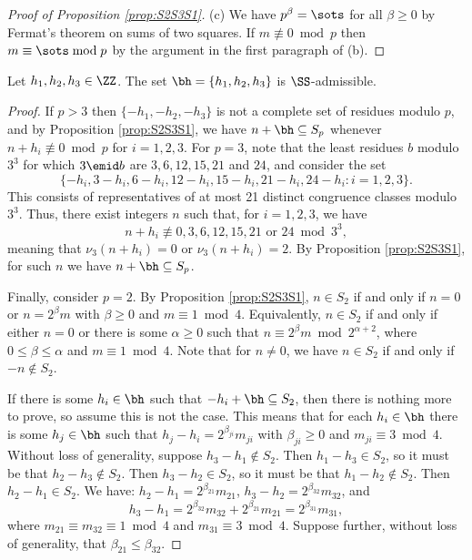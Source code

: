 \documentclass[12pt, reqno, twoside, letterpaper]{amsart}
\begin{document}
\begin{nix}
\begin{proof}[Proof of Proposition \ref{prop:S2S3S1}]
(c) 
%
We have $p^{\beta} = \sots$ for all $\beta \ge 0$ by Fermat's 
theorem on sums of two squares.
%
If $m \not\equiv 0 \bmod p$ then $m \equiv \sots \bmod p$ by 
the argument in the first paragraph of (b).
\end{proof}
%
\end{nix}

\begin{nix}
%
\begin{proposition}
 \label{prop:tripadmiss}
Let $h_1,h_2,h_3 \in \ZZ$.
%
The set $\bh = \{h_1,h_2,h_3\}$ is $\SS$-admissible.
\end{proposition}

\begin{proof}
%
If $p > 3$ then $\{-h_1,-h_2,-h_3\}$ is not a complete set of 
residues modulo $p$, and by Proposition \ref{prop:S2S3S1}, we have 
$n + \bh \subseteq S_p$ whenever $n + h_i \not\equiv 0 \bmod p$ 
for $i = 1,2,3$.
%
For $p = 3$, note that the least residues $b$ modulo $3^3$ for 
which $3 \emid b$ are $3,6,12,15,21$ and $24$, and consider the 
set 
\[
 \{-h_i,3 - h_i,6 - h_i,12 - h_i,15 - h_i,21 - h_i,24 - h_i : i = 1,2,3\}.
\]
%
This consists of representatives of at most 21 distinct 
congruence classes modulo $3^3$.
%
Thus, there exist integers $n$ such that, for $i = 1,2,3$, we have 
\[
 \text{$n + h_i \not\equiv 0,3,6,12,15,21$ or $24 \bmod 3^3$},
\]
meaning that $\nu_3(n + h_i) = 0$ or $\nu_3(n + h_i) = 2$.
%
By Proposition \ref{prop:S2S3S1}, for such $n$ we have 
$n + \bh \subseteq S_p$. 

Finally, consider $p = 2$.
%
By Proposition \ref{prop:S2S3S1}, $n \in S_2$ if and only if 
$n = 0$ or $n = 2^{\beta}m$ with $\beta \ge 0$ and 
$m \equiv 1 \bmod 4$.
%
Equivalently, $n \in S_2$ if and only if either $n = 0$ or there 
is some $\alpha \ge 0$ such that 
$n \equiv 2^{\beta}m \bmod 2^{\alpha + 2}$, where  
$0 \le \beta \le \alpha$ and $m \equiv 1 \bmod 4$.
%
Note that for $n \ne 0$, we have $n \in S_2$ if and only if 
$-n \not\in S_2$.

If there is some $h_i \in \bh$ such that 
$-h_i + \bh \subseteq S_2$, then there is nothing more to prove, 
so assume this is not the case.
%
This means that for each $h_i \in \bh$ there is some $h_j \in \bh$ 
such that $h_j - h_i = 2^{\beta_{ji}}m_{ji}$ with 
$\beta_{ji} \ge 0$ and $m_{ji} \equiv 3 \bmod 4$.
%
Without loss of generality, suppose $h_3 - h_1 \not\in S_2$.
%
Then $h_1 - h_3 \in S_2$, so it must be that 
$h_2 - h_3 \not\in S_2$.
%
Then $h_3 - h_2 \in S_2$, so it must be that 
$h_1 - h_2 \not\in S_2$.
%
Then $h_2 - h_1 \in S_2$.
%
We have: 
$h_2 - h_1 = 2^{\beta_{21}}m_{21}$,
$h_3 - h_2 = 2^{\beta_{32}}m_{32}$, and 
\[
 h_3 - h_1 = 2^{\beta_{32}}m_{32} + 2^{\beta_{21}}m_{21} 
           = 2^{\beta_{31}}m_{31},
\]
where $m_{21} \equiv m_{32} \equiv 1 \bmod 4$ and 
$m_{31} \equiv 3 \bmod 4$.
%
Suppose further, without loss of generality, that 
$\beta_{21} \le \beta_{32}$.


\end{proof}
\end{nix}
\end{document}

